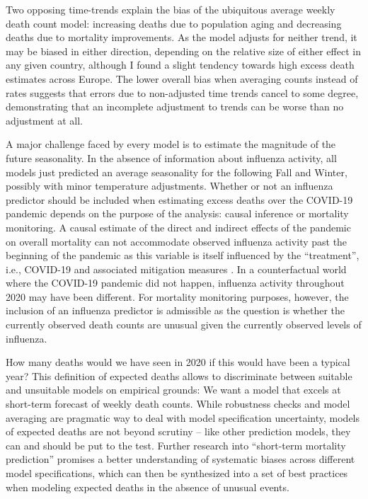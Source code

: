 \documentclass[10pt,letterpaper]{article}
\begin{document}
Two opposing time-trends explain the bias of the ubiquitous average weekly death count model: increasing deaths due to population aging and decreasing deaths due to mortality improvements. As the model adjusts for neither trend, it may be biased in either direction, depending on the relative size of either effect in any given country, although I found a slight tendency towards high excess death estimates across Europe. The lower overall bias when averaging counts instead of rates suggests that errors due to non-adjusted time trends cancel to some degree, demonstrating that an incomplete adjustment to trends can be worse than no adjustment at all.

A major challenge faced by every model is to estimate the magnitude of the future seasonality. In the absence of information about influenza activity, all models just predicted an average seasonality for the following Fall and Winter, possibly with minor temperature adjustments. Whether or not an influenza predictor should be included when estimating excess deaths over the COVID-19 pandemic depends on the purpose of the analysis: causal inference or mortality monitoring. A causal estimate of the direct and indirect effects of the pandemic on overall mortality can not accommodate observed influenza activity past the beginning of the pandemic as this variable is itself influenced by the ``treatment'', i.e., COVID-19 and associated mitigation measures \cite{Cowling2020, Soo2020}. In a counterfactual world where the COVID-19 pandemic did not happen, influenza activity throughout 2020 may have been different. For mortality monitoring purposes, however, the inclusion of an influenza predictor is admissible as the question is whether the currently observed death counts are unusual given the currently observed levels of influenza.

How many deaths would we have seen in 2020 if this would have been a typical year? This definition of expected deaths allows to discriminate between suitable and unsuitable models on empirical grounds: We want a model that excels at short-term forecast of weekly death counts. While robustness checks and model averaging are pragmatic way to deal with model specification uncertainty, models of expected deaths are not beyond scrutiny -- like other prediction models, they can and should be put to the test. Further research into ``short-term mortality prediction'' promises a better understanding of systematic biases across different model specifications, which can then be synthesized into a set of best practices when modeling expected deaths in the absence of unusual events.
\end{document}
